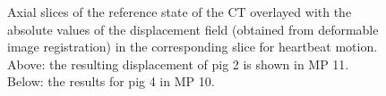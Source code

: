 \begin{figure}[H]
\centering
{}
\caption{Axial slices of the reference state of the CT overlayed with the absolute values of the displacement field (obtained from 
deformable image registration) in the corresponding slice for heartbeat motion. Above: the resulting displacement of pig 2 is shown 
in MP 11. Below: the results for pig 4 in MP 10.}
\label{contour_plot_hb_pigs}
\end{figure}
 
